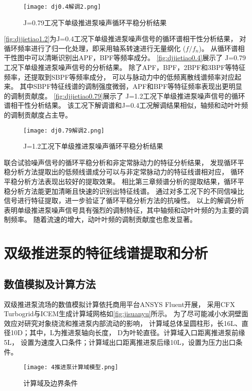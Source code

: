 \begin{figure}[htbp]
    \centering
    \texttt{[image: dj0.4解调2.png]}
    \caption{\label{fig:djjietiao0.4}J=0.79工况下单级推进泵噪声循环平稳分析结果}
\end{figure}

\autoref{fig:djjietiao1.2}为J=0.4工况下单级推进泵噪声信号的循环谱相干性分析结果，
对循环频率进行了归一化处理，即采用轴系转速进行无量纲化 ($f/f_n$)。
从循环谱相干性图中可以清晰识别出APF，BPF等频率成分。
\autoref{fig:djjietiao0.4}展示了 J=0.79工况下单级推进泵噪声信号的分析结果。
除了APF，BPF，2BPF和3BPF等特征频率，还提取到SBPF等频率成分，
可以与脉动力中的低频离散线谱频率对应起来。
其中SBPF特征线谱的调制强度微弱，APF和BPF等特征频率表现出更明显的调制贡献度。
\autoref{fig:djjietiao0.79}展示了 J=1.2工况下单级推进泵噪声信号的循环谱相干性分析结果。
该工况下解调谱和J=0.4工况解调结果相似，轴频和动叶叶频的调制贡献度占主导。
\begin{figure}[htbp]
    \centering
    \texttt{[image: dj0.79解调2.png]}
    \caption{\label{fig:djjietiao0.79}J=1.2工况下单级推进泵噪声循环平稳分析结果}
\end{figure}

联合试验噪声信号的循环平稳分析和非定常脉动力的特征分析结果，
发现循环平稳分析方法提取出的低频线谱成分可以与非定常脉动力的特征线谱相对应，
循环平稳分析方法表现出较好的提取效果。
相比第三章频谱分析的提取结果，循环平稳分析方法能更加清晰且快速的识别出特征线谱。
通过对多工况下的不同信噪比信号进行特征提取，进一步验证了循环平稳分析方法的抗噪性。
以上的解调分析表明单级推进泵噪声信号具有强烈的调制特征，其中轴频和动叶叶频的为主要的调制频率。
随着流速的增大，动叶叶频的调制贡献度也愈发显著。

\section{双级推进泵的特征线谱提取和分析}
\subsection{数值模拟及计算方法}
双级推进泵流场的数值模拟计算依托商用平台ANSYS Fluent开展，
采用CFX Turbogrid与ICEM生成计算域网格如\autoref{fig:jisuanyu}所示。
为了尽可能减小水洞壁面效应对研究对象绕流和推进泵内部流动的影响，
计算域总体呈圆柱形，长16L、直径10D；其中，L为推进泵轴向长度，
D为叶轮直径。计算域入口距离推进泵前缘5L，
设置为速度入口条件；计算域出口距离推进泵后缘10L，设置为压力出口条件。
\begin{figure}[htbp]
    \centering
    \texttt{[image: 4推进泵计算域模型.png]}
    \caption{\label{fig:jisuanyu}计算域及边界条件}
\end{figure}

